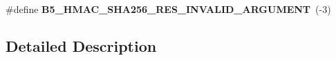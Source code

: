 \begin{DoxyCompactItemize}
\item 
\hypertarget{group__sha_return_ga5c102e416cabfba16db0f9ec5731cced}{\#define {\bfseries B5\-\_\-\-H\-M\-A\-C\-\_\-\-S\-H\-A256\-\_\-\-R\-E\-S\-\_\-\-I\-N\-V\-A\-L\-I\-D\-\_\-\-A\-R\-G\-U\-M\-E\-N\-T}~(-\/3)}\label{group__sha_return_ga5c102e416cabfba16db0f9ec5731cced}

\end{DoxyCompactItemize}


\subsection{Detailed Description}
